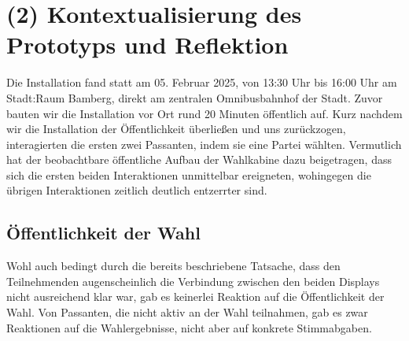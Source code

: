 \section{(2) Kontextualisierung des Prototyps und Reflektion}\label{kontextualisierung}

Die Installation fand statt am 05. Februar 2025, von 13:30 Uhr bis 16:00 Uhr am Stadt:Raum Bamberg, direkt am zentralen Omnibusbahnhof der Stadt.
Zuvor bauten wir die Installation vor Ort rund 20 Minuten öffentlich
auf.
Kurz nachdem wir die Installation der Öffentlichkeit überließen und uns zurückzogen, interagierten die ersten zwei Passanten, indem sie eine Partei wählten.
Vermutlich hat der beobachtbare öffentliche Aufbau der Wahlkabine dazu beigetragen, dass sich die ersten beiden Interaktionen unmittelbar ereigneten, wohingegen die übrigen Interaktionen zeitlich deutlich entzerrter sind.





\subsection{Öffentlichkeit der Wahl}\label{uxf6ffentlichkeit-der-wahl}

Wohl auch bedingt durch die bereits beschriebene Tatsache, dass den Teilnehmenden augenscheinlich die Verbindung zwischen den beiden Displays nicht ausreichend klar war, gab es keinerlei Reaktion auf die Öffentlichkeit der Wahl.
Von Passanten, die nicht aktiv an der Wahl teilnahmen, gab es zwar Reaktionen auf die Wahlergebnisse, nicht aber auf konkrete Stimmabgaben.
